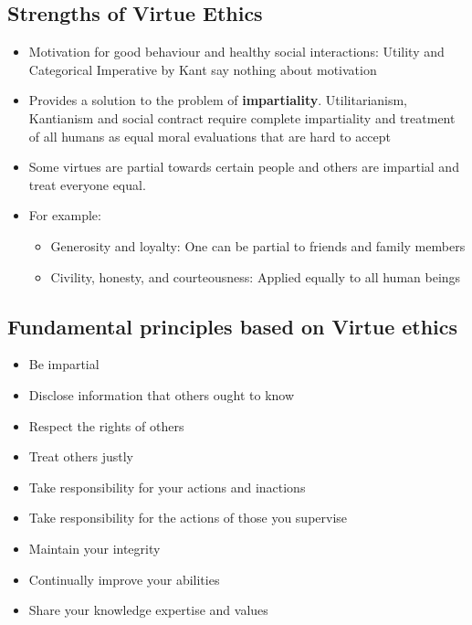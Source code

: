 \documentclass{article}
\begin{document}
\subsection{Strengths of Virtue Ethics}

\begin{flushleft}
\begin{itemize}
  \item Motivation for good behaviour and healthy social interactions: Utility and Categorical Imperative by Kant say nothing about motivation
  \item Provides a solution to the problem of \textbf{impartiality}. Utilitarianism, Kantianism and social contract require complete impartiality and treatment of all humans as equal moral evaluations that are hard to accept
  \item Some virtues are partial towards certain people and others are impartial and treat everyone equal.
  \item For example:
  \begin{itemize}
    \item Generosity and loyalty: One can be partial to friends and family members
    \item Civility, honesty, and courteousness: Applied equally to all human beings
  \end{itemize}
\end{itemize}
\end{flushleft}

\subsection{Fundamental principles based on Virtue ethics}
\begin{itemize}
  \item Be impartial
  \item Disclose information that others ought to know 
  \item Respect the rights of others
  \item Treat others justly
  \item Take responsibility for your actions and inactions
  \item Take responsibility for the actions of those you supervise
  \item Maintain your integrity
  \item Continually improve your abilities
  \item Share your knowledge expertise and values
\end{itemize}
\end{document}

